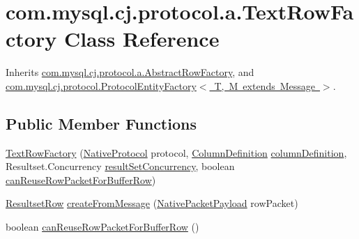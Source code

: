 \hypertarget{classcom_1_1mysql_1_1cj_1_1protocol_1_1a_1_1_text_row_factory}{}\section{com.\+mysql.\+cj.\+protocol.\+a.\+Text\+Row\+Factory Class Reference}
\label{classcom_1_1mysql_1_1cj_1_1protocol_1_1a_1_1_text_row_factory}


Inherits \mbox{\hyperlink{classcom_1_1mysql_1_1cj_1_1protocol_1_1a_1_1_abstract_row_factory}{com.\+mysql.\+cj.\+protocol.\+a.\+Abstract\+Row\+Factory}}, and \mbox{\hyperlink{interfacecom_1_1mysql_1_1cj_1_1protocol_1_1_protocol_entity_factory}{com.\+mysql.\+cj.\+protocol.\+Protocol\+Entity\+Factory$<$ T, M extends Message $>$}}.

\subsection*{Public Member Functions}
\begin{DoxyCompactItemize}
\item 
\mbox{\hyperlink{classcom_1_1mysql_1_1cj_1_1protocol_1_1a_1_1_text_row_factory_a0655493ffefb46e843346cc24bdc2db9}{Text\+Row\+Factory}} (\mbox{\hyperlink{classcom_1_1mysql_1_1cj_1_1protocol_1_1a_1_1_native_protocol}{Native\+Protocol}} protocol, \mbox{\hyperlink{interfacecom_1_1mysql_1_1cj_1_1protocol_1_1_column_definition}{Column\+Definition}} \mbox{\hyperlink{classcom_1_1mysql_1_1cj_1_1protocol_1_1a_1_1_text_row_factory_a723ac4ba54ca214d91299abaa333693e}{column\+Definition}}, Resultset.\+Concurrency \mbox{\hyperlink{classcom_1_1mysql_1_1cj_1_1protocol_1_1a_1_1_text_row_factory_a7bf45e9680bd7908c812398a3206c79d}{result\+Set\+Concurrency}}, boolean \mbox{\hyperlink{classcom_1_1mysql_1_1cj_1_1protocol_1_1a_1_1_text_row_factory_ad1c4d5c8f2bab424674be72ed7a4bb21}{can\+Reuse\+Row\+Packet\+For\+Buffer\+Row}})
\item 
\mbox{\hyperlink{interfacecom_1_1mysql_1_1cj_1_1protocol_1_1_resultset_row}{Resultset\+Row}} \mbox{\hyperlink{classcom_1_1mysql_1_1cj_1_1protocol_1_1a_1_1_text_row_factory_abb512d21748eabdf15597e3fd8015aac}{create\+From\+Message}} (\mbox{\hyperlink{classcom_1_1mysql_1_1cj_1_1protocol_1_1a_1_1_native_packet_payload}{Native\+Packet\+Payload}} row\+Packet)
\item 
boolean \mbox{\hyperlink{classcom_1_1mysql_1_1cj_1_1protocol_1_1a_1_1_text_row_factory_a330ee4eed94a0c86cf6fa3aa65ad902f}{can\+Reuse\+Row\+Packet\+For\+Buffer\+Row}} ()
\end{DoxyCompactItemize}
